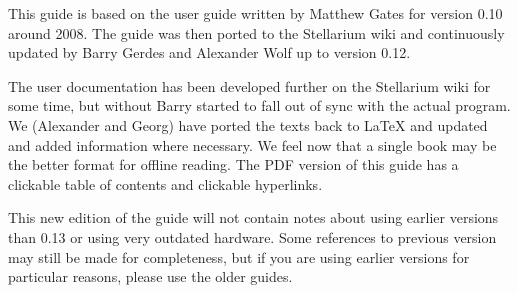 This guide is based on the user guide written by Matthew Gates for
version 0.10 around 2008. The guide was then ported to the Stellarium
wiki and continuously updated by Barry Gerdes and Alexander Wolf up to version 0.12. 

The user documentation has been developed further on the Stellarium
wiki for some time, but without Barry started to fall out of sync with
the actual program.  We (Alexander and Georg) have ported the texts
back to \LaTeX{} and updated and added information where necessary. We
feel now that a single book may be the better format for offline
reading. The PDF version of this guide has a clickable table of
contents and clickable hyperlinks.

This new edition of the guide will not contain notes about using
earlier versions than 0.13 or using very outdated hardware. Some
references to previous version may still be made for completeness, 
but if you are using earlier versions
for particular reasons, please use the older guides.

